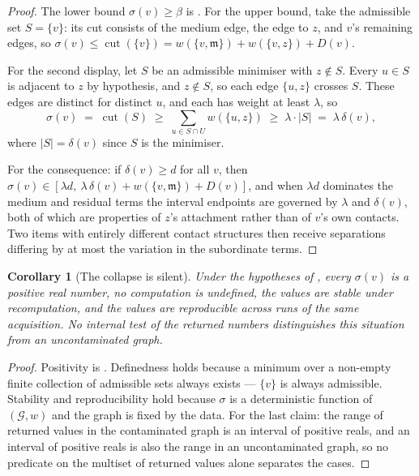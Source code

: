 \documentclass[11pt,a4paper]{article}
\newtheorem{corollary}[theorem]{Corollary}
\theoremstyle{definition}
\theoremstyle{remark}
\newcommand{\Gph}{\mathcal{G}}
\newcommand{\wt}{w}
\newcommand{\med}{\mathfrak{m}}
\newcommand{\flo}{\beta}
\newcommand{\cut}{\operatorname{cut}}
\newcommand{\sep}{\sigma}
\newcommand{\dep}{\delta}
\begin{document}
\begin{proof}
The lower bound $\sep(v)\geq\flo$ is . For the upper
bound, take the admissible set $S = \{v\}$: its cut consists of the
medium edge, the edge to $z$, and $v$'s remaining edges, so
$\sep(v) \leq \cut(\{v\}) = \wt(\{v,\med\}) + \wt(\{v,z\}) + D(v)$.

For the second display, let $S$ be an admissible minimiser with
$z \notin S$. Every $u \in S$ is adjacent to $z$ by hypothesis, and
$z \notin S$, so each edge $\{u,z\}$ crosses $S$. These edges are
distinct for distinct $u$, and each has weight at least $\lambda$, so
\[
\sep(v) \;=\; \cut(S) \;\geq\; \sum_{u \in S \cap U} \wt(\{u,z\})
\;\geq\; \lambda \cdot |S| \;=\; \lambda\,\dep(v),
\]
where $|S| = \dep(v)$ since $S$ is the minimiser.

For the consequence: if $\dep(v) \geq d$ for all $v$, then
$\sep(v) \in [\lambda d,\ \lambda\,\dep(v) + \wt(\{v,\med\}) + D(v)]$,
and when $\lambda d$ dominates the medium and residual terms the interval
endpoints are governed by $\lambda$ and $\dep(v)$, both of which are
properties of $z$'s attachment rather than of $v$'s own contacts. Two
items with entirely different contact structures then receive separations
differing by at most the variation in the subordinate terms.
\end{proof}

\begin{corollary}[The collapse is silent]\label{cor:silent}
Under the hypotheses of , every $\sep(v)$ is a
positive real number, no computation is undefined, the values are stable
under recomputation, and the values are reproducible across runs of the
same acquisition. No internal test of the returned numbers distinguishes
this situation from an uncontaminated graph.
\end{corollary}

\begin{proof}
Positivity is . Definedness holds because a minimum over
a non-empty finite collection of admissible sets always exists ---
$\{v\}$ is always admissible. Stability and reproducibility hold because
$\sep$ is a deterministic function of $(\Gph,\wt)$ and the graph is fixed
by the data. For the last claim: the range of returned values in the
contaminated graph is an interval of positive reals, and an interval of
positive reals is also the range in an uncontaminated graph, so no
predicate on the multiset of returned values alone separates the cases.
\end{proof}
\end{document}
